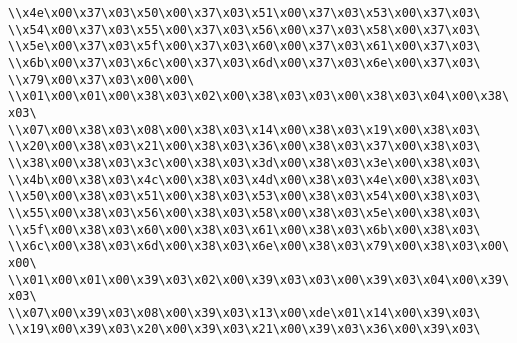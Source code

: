 \verb|\\x4e\x00\x37\x03\x50\x00\x37\x03\x51\x00\x37\x03\x53\x00\x37\x03\|\newline
\verb|\\x54\x00\x37\x03\x55\x00\x37\x03\x56\x00\x37\x03\x58\x00\x37\x03\|\newline
\verb|\\x5e\x00\x37\x03\x5f\x00\x37\x03\x60\x00\x37\x03\x61\x00\x37\x03\|\newline
\verb|\\x6b\x00\x37\x03\x6c\x00\x37\x03\x6d\x00\x37\x03\x6e\x00\x37\x03\|\newline
\verb|\\x79\x00\x37\x03\x00\x00\|\newline
\verb|\\x01\x00\x01\x00\x38\x03\x02\x00\x38\x03\x03\x00\x38\x03\x04\x00\x38\x03\|\newline
\verb|\\x07\x00\x38\x03\x08\x00\x38\x03\x14\x00\x38\x03\x19\x00\x38\x03\|\newline
\verb|\\x20\x00\x38\x03\x21\x00\x38\x03\x36\x00\x38\x03\x37\x00\x38\x03\|\newline
\verb|\\x38\x00\x38\x03\x3c\x00\x38\x03\x3d\x00\x38\x03\x3e\x00\x38\x03\|\newline
\verb|\\x4b\x00\x38\x03\x4c\x00\x38\x03\x4d\x00\x38\x03\x4e\x00\x38\x03\|\newline
\verb|\\x50\x00\x38\x03\x51\x00\x38\x03\x53\x00\x38\x03\x54\x00\x38\x03\|\newline
\verb|\\x55\x00\x38\x03\x56\x00\x38\x03\x58\x00\x38\x03\x5e\x00\x38\x03\|\newline
\verb|\\x5f\x00\x38\x03\x60\x00\x38\x03\x61\x00\x38\x03\x6b\x00\x38\x03\|\newline
\verb|\\x6c\x00\x38\x03\x6d\x00\x38\x03\x6e\x00\x38\x03\x79\x00\x38\x03\x00\x00\|\newline
\verb|\\x01\x00\x01\x00\x39\x03\x02\x00\x39\x03\x03\x00\x39\x03\x04\x00\x39\x03\|\newline
\verb|\\x07\x00\x39\x03\x08\x00\x39\x03\x13\x00\xde\x01\x14\x00\x39\x03\|\newline
\verb|\\x19\x00\x39\x03\x20\x00\x39\x03\x21\x00\x39\x03\x36\x00\x39\x03\|\newline
